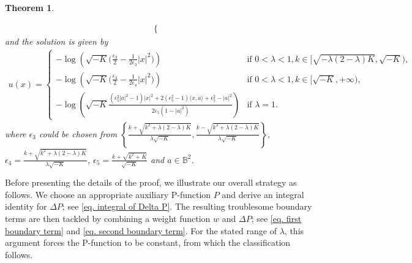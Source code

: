 \documentclass[11pt,a4paper,twoside]{amsart}
\newtheorem{theorem}{Theorem} [section]
\newtheorem{sketch proof}{Sketch of the proof}[section]
\begin{document}
\begin{theorem}
\begin{enumerate}
\begin{align*}
\begin{cases}
        \end{cases}
        \end{align*}
        and the solution is given by
        \begin{align}\label{eq. solution for negative K small lambda}
            u(x)=
            \begin{cases}
               \displaystyle{ -\log\left(
                \sqrt{-K}
                \Big(\frac{\epsilon_3}{2}-\frac{1}{2\epsilon_3}|x|^2\Big)
                \right)} &\text{if } 0<\lambda<1,
                 k\in[\sqrt{-\lambda(2-\lambda)K},\sqrt{-K}),\\[3mm]
            \displaystyle{-\log\left(
                \sqrt{-K}
        \Big(\frac{\epsilon_4}{2}-\frac{1}{2\epsilon_4}|x|^2\Big)
                \right)} &\text{if } 0<\lambda<1,
                 k\in[\sqrt{-K},+\infty),\\[3mm]
                -\log\left(
                    \sqrt{-K}
    \frac{(\epsilon_5^2|a|^2-1)|x|^2
    +2(\epsilon_5^2-1)\langle x,a\rangle
    +\epsilon_5^2-|a|^2}{2\epsilon_5(1-|a|^2)}
                \right) &\text{if }\lambda=1.
            \end{cases}
        \end{align}
    where $\epsilon_3$ could be chosen from $\left\{
    \frac{k+\sqrt{k^2+\lambda(2-\lambda)K}}
    {\lambda\sqrt{-K}},
    \frac{k-\sqrt{k^2+\lambda(2-\lambda)K}}
    {\lambda\sqrt{-K}}   \right\}$, $\epsilon_4=\frac{k+\sqrt{k^2+\lambda(2-\lambda)K}}
    {\lambda\sqrt{-K}}$, $\epsilon_5=\frac{k+\sqrt{k^2+K}}{\sqrt{-K}}$ and $a\in\mathbb{B}^2$.
\end{enumerate}
\end{theorem}

Before presenting the details of the proof, we illustrate our overall strategy as follows. We choose an appropriate auxiliary P-function $P$ and derive an integral identity for $\Delta P$; see \cref{eq. integral of Delta P}. The resulting troublesome  boundary terms are then tackled by combining a weight function $w$ and $\Delta P$; see \cref{eq. first boundary term} and \cref{eq. second boundary term}. For the stated range of $\lambda$, this argument forces the P-function to be constant, from which the classification follows.
\end{document}
